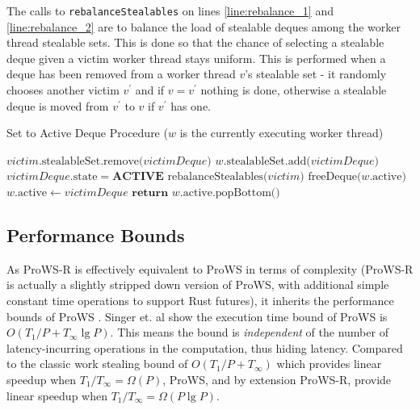 \documentclass[bsc,frontabs,singlespacing,parskip,deptreport,normalheadings]{infthesis}
\begin{document}
The calls to \texttt{rebalanceStealables} on lines \ref{line:rebalance_1} and
\ref{line:rebalance_2} are to balance the load of stealable deques among the
worker thread stealable sets. This is done so that the chance of selecting a
stealable deque given a victim worker thread stays uniform. This is performed
when a deque has been removed from a worker thread \(v\)'s stealable set - it
randomly chooses another victim \(v^\prime\) and if \(v = v^\prime\) nothing is
done, otherwise a stealable deque is moved from \(v^\prime\) to \(v\) if
\(v^\prime\) has one.

\begin{algorithm}
\caption{Set to Active Deque Procedure ($w$ is the currently executing worker thread)}\label{alg:steal}
\begin{algorithmic}[1]
        \State $ victim \text{.stealableSet.remove(} victimDeque \text{)} $
        \State $ w \text{.stealableSet.add(} victimDeque \text{)} $
        \State $ victimDeque \text{.state} = \textbf{ACTIVE} $
        \State $ \text{rebalanceStealables(} victim \text{)} $
            \label{line:rebalance_2}
            \State $ \text{freeDeque(} w \text{.active)} $
        \EndIf
        \State $ w \text{.active} \gets victimDeque $
        \State $ \textbf{return } w \text{.active.popBottom()} $
    \EndFunction
\end{algorithmic}
\end{algorithm}

\subsection{Performance Bounds}
\label{subsection:performance_bounds}

As ProWS-R is effectively equivalent to ProWS in terms of complexity (ProWS-R is
actually a slightly stripped down version of ProWS, with additional simple
constant time operations to support Rust futures), it inherits the performance
bounds of ProWS \cite{singer_proactive_2019, singer_scheduling_2019}. Singer et.
al show the execution time bound of ProWS is \(O(T_1 / P + T_\infty \lg P)\).
This means the bound is \textit{independent} of the number of latency-incurring operations in
the computation, thus hiding latency. Compared to the classic work stealing
bound of \(O(T_1 / P + T_\infty)\) which provides linear speedup when \(T_1 /
T_\infty = \Omega(P)\), ProWS, and by extension ProWS-R, provide linear speedup
when \(T_1 / T_\infty = \Omega(P \lg P)\).
\end{document}
